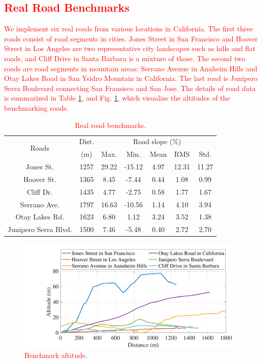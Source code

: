 \documentclass{IEEEtran}
\begin{document}
\textcolor{red}{\subsection{Real Road Benchmarks}} \label{subsec:benchmarks}

\textcolor{red}{We implement six real roads from various locations in California. The first three roads consist of road segments in cities. Jones Street in San Francisco and Hoover Street in Los Angeles are two representative city landscapes such as hills and flat roads, and Cliff Drive in Santa Barbara is a mixture of those. The second two roads are road segments in mountain areas: Serrano Avenue in Anaheim Hills and Otay Lakes Road in San Ysidro Mountain in California. The last road is Junipero Serra Boulevard connecting San Fransisco and San Jose. The details of road data is summarized in Table \ref{table:road_bench}, and Fig. \ref{fig:bench_altitude}, which visualize the altitudes of the benchmarking roads.}

\begin{table} 
\caption{\textcolor{red}{Real road benchmarks.}}
\centering
\label{table:road_bench}
\begin{tabular}{|c|c|c|c|c|c|c|}  \hline
\multirow{2}{*}{Roads} 
				&Dist.		&\multicolumn{5}{|c|}{Road slope (\%)}  \\ \cline{3-7}
				&(m)		 	&Max.		&Min. 	&Mean		&RMS 	&Std.	\\ \hline
Jones St. 	&1257		&29.22		&-15.12	&4.97 		&12.31 	&11.27	\\ \hline
Hoover St. 	&1365		&8.45		&-7.44	&0.44		&1.08 	&0.99	\\ \hline
Cliff Dr. 	&1435		&4.77		&-2.75	&0.58		&1.77 	&1.67	\\ \hline
Serrano Ave.		&1797		&16.63		&-10.56	&1.14 		&4.10 	&3.94	\\ \hline
Otay Lakes Rd.		&1623		&6.80		&1.12	&3.24		&3.52 	&1.38	\\ \hline
Junipero Serra Blvd.	&1500		&7.46		&-5.48	&0.40		&2.72 	&2.70	\\ \hline
\end{tabular}
\end{table}


\begin{figure}	 %
\includegraphics[width=1.0\hsize]{Figures/Benchmark_altitude.pdf}
\caption{\textcolor{red}{Benchmark altitude.}}
\label{fig:bench_altitude}
\end{figure} 
\end{document}
